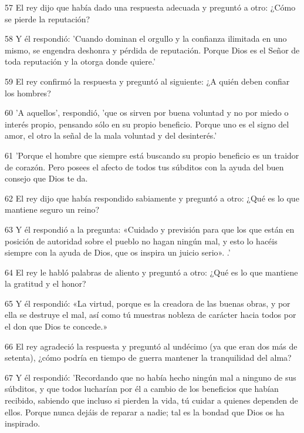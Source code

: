 \par 57 El rey dijo que había dado una respuesta adecuada y preguntó a otro: ¿Cómo se pierde la reputación?

\par 58 Y él respondió: 'Cuando dominan el orgullo y la confianza ilimitada en uno mismo, se engendra deshonra y pérdida de reputación. Porque Dios es el Señor de toda reputación y la otorga donde quiere.'

\par 59 El rey confirmó la respuesta y preguntó al siguiente: ¿A quién deben confiar los hombres?

\par 60 'A aquellos', respondió, 'que os sirven por buena voluntad y no por miedo o interés propio, pensando sólo en su propio beneficio. Porque uno es el signo del amor, el otro la señal de la mala voluntad y del desinterés.'

\par 61 'Porque el hombre que siempre está buscando su propio beneficio es un traidor de corazón. Pero posees el afecto de todos tus súbditos con la ayuda del buen consejo que Dios te da.

\par 62 El rey dijo que había respondido sabiamente y preguntó a otro: ¿Qué es lo que mantiene seguro un reino?

\par 63 Y él respondió a la pregunta: «Cuidado y previsión para que los que están en posición de autoridad sobre el pueblo no hagan ningún mal, y esto lo hacéis siempre con la ayuda de Dios, que os inspira un juicio serio». .'

\par 64 El rey le habló palabras de aliento y preguntó a otro: ¿Qué es lo que mantiene la gratitud y el honor?

\par 65 Y él respondió: «La virtud, porque es la creadora de las buenas obras, y por ella se destruye el mal, así como tú muestras nobleza de carácter hacia todos por el don que Dios te concede.»

\par 66 El rey agradeció la respuesta y preguntó al undécimo (ya que eran dos más de setenta), ¿cómo podría en tiempo de guerra mantener la tranquilidad del alma?

\par 67 Y él respondió: 'Recordando que no había hecho ningún mal a ninguno de sus súbditos, y que todos lucharían por él a cambio de los beneficios que habían recibido, sabiendo que incluso si pierden la vida, tú cuidar a quienes dependen de ellos. Porque nunca dejáis de reparar a nadie; tal es la bondad que Dios os ha inspirado.

